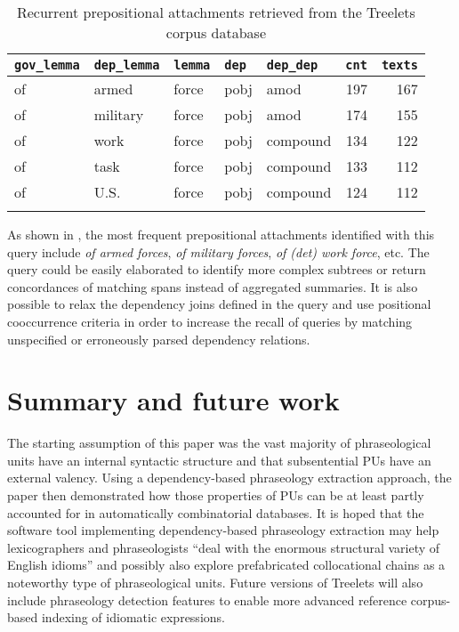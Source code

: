 \documentclass[output=paper]{langscibook}
\begin{document}
\begin{table}[p]
\begin{tabular}{lllllrr}
\lsptoprule
\texttt{gov\_lemma} & \texttt{dep\_lemma} & \texttt{lemma} & \texttt{dep} & \texttt{dep\_dep} & \texttt{cnt} & \texttt{texts}\\
\midrule
of & armed & force & pobj & amod &  197 &  167\\
of & military & force & pobj & amod &  174 &  155\\
of & work & force & pobj & compound &  134 &  122\\
of & task & force & pobj & compound &  133 &  112\\
of & U.S. & force & pobj & compound &  124 &  112\\
\lspbottomrule
\end{tabular}
\caption{\label{tab:pezik:13}Recurrent prepositional attachments retrieved from the Treelets corpus database}
\end{table}


As shown in , the most frequent prepositional attachments identified with this query include \textit{of armed forces}, \textit{of military forces}, \textit{of (det) work force}, etc. The query could be easily elaborated to identify more complex subtrees or return concordances of matching spans instead of aggregated summaries. It is also possible to relax the dependency joins defined in the query and use positional cooccurrence criteria in order to increase the recall of queries by matching unspecified or erroneously parsed dependency relations.


\section{Summary and future work}

The starting assumption of this paper was the vast majority of phraseological units have an internal syntactic structure and that subsentential PUs have an external valency. Using a dependency-based phraseology extraction approach, the paper then demonstrated how those properties of PUs can be at least partly accounted for in automatically combinatorial databases. It is hoped that the software tool implementing dependency-based phraseology extraction may help lexicographers and phraseologists “deal with the enormous structural variety of English idioms” \citep[11]{CowieEtAl1993} and possibly also explore prefabricated collocational chains as a noteworthy type of phraseological units. Future versions of Treelets will also include phraseology detection features \citep{Pęzik2018} to enable more advanced reference corpus-based indexing of idiomatic expressions.

{\sloppy\printbibliography[heading=subbibliography,notkeyword=this]}
\end{document}
